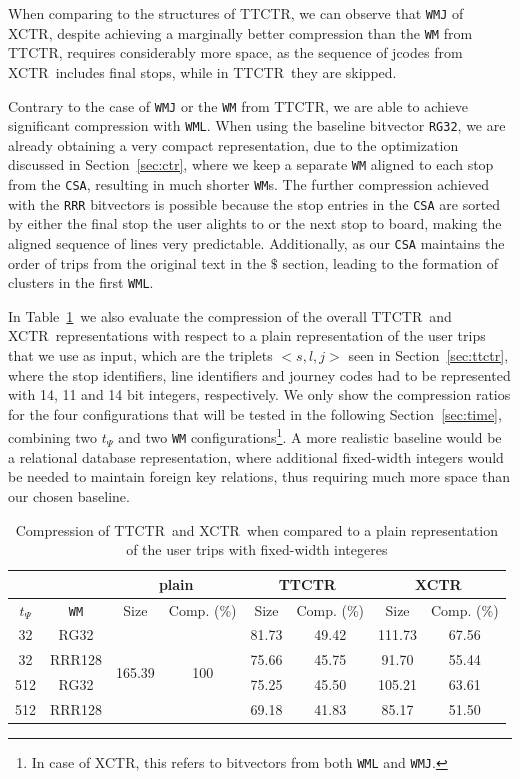 \documentclass[runningheads]{llncs}
\newcommand{\ctr}{XCTR}
\newcommand{\ttctr}{TTCTR}
\begin{document}
When comparing to the structures of \ttctr, we can observe that \texttt{WMJ} of \ctr, despite achieving a marginally better compression than the \texttt{WM} from \ttctr, requires considerably more space, as the sequence of jcodes from \ctr~includes final stops, while in \ttctr~they are skipped.

Contrary to the case of \texttt{WMJ} or the \texttt{WM} from \ttctr, we are able to achieve significant compression with \texttt{WML}. When using the baseline bitvector \texttt{RG32}, we are already obtaining a very compact representation, due to the optimization discussed in Section~\ref{sec:ctr}, where we keep a separate \texttt{WM} aligned to each stop from the \texttt{CSA}, resulting in much shorter \texttt{WM}s. The further compression achieved with the \texttt{RRR} bitvectors is possible because the stop entries in the \texttt{CSA} are sorted by either the final stop the user alights to or the next stop to board, making the aligned sequence of lines very predictable. Additionally, as our \texttt{CSA} maintains the order of trips from the original text in the $\$$ section, leading to the formation of clusters in the first \texttt{WML}.

In Table~\ref{tab:comp}~we also evaluate the compression of the overall \ttctr~and \ctr~representations with respect to a plain representation of the user trips that we use as input, which are the triplets $<s,l,j>$ seen in Section~\ref{sec:ttctr}, where the stop identifiers, line identifiers and journey codes had to be represented with 14, 11 and 14 bit integers, respectively. We only show the compression ratios for the four configurations that will be tested in the following Section~\ref{sec:time}, combining two $t_{\Psi}$ and two \texttt{WM} configurations\footnote{In case of \ctr, this refers to bitvectors from both \texttt{WML} and \texttt{WMJ}.}. A more realistic baseline would be a relational database representation, where additional fixed-width integers would be needed to maintain foreign key relations, thus requiring much more space than our chosen baseline.

\begin{table}
    \centering
    \caption{Compression of \ttctr~and \ctr~when compared to a plain representation of the user trips with fixed-width integeres}
    \label{tab:comp}
    \begin{tabular}{|c|c|c|c|c|c|c|c|}
    \cline{3-8}
    \multicolumn{2}{c}{} & \multicolumn{2}{|c|}{plain} & \multicolumn{2}{|c|}{\ttctr} & \multicolumn{2}{|c|}{\ctr} \\
    \hline
    $t_{\Psi}$ & \texttt{WM} & Size & Comp. (\%) & Size & Comp. (\%) & Size & Comp. (\%) \\
    \hline
    32 & RG32 & \multirow{4}{*}{165.39} & \multirow{4}{*}{100} & 81.73 & 49.42 & 111.73 & 67.56 \\
    32 & RRR128 & & & 75.66 & 45.75 & 91.70 & 55.44 \\
    512 & RG32 & & & 75.25 & 45.50 & 105.21 & 63.61 \\
    512 & RRR128 & & & 69.18 & 41.83 & 85.17 & 51.50 \\
    \hline
    \end{tabular}
\end{table}
\end{document}
